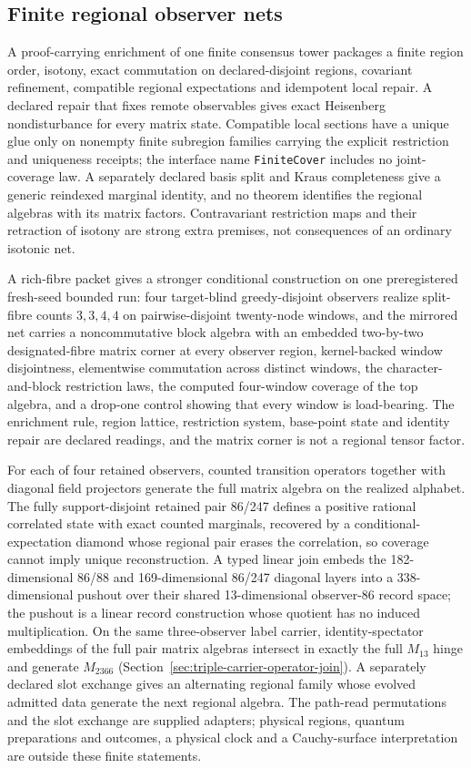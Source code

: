 \documentclass[11pt]{article}
\newcounter{none}
\begin{document}
\subsection{Finite regional observer nets}
\label{sec:regional-net}

A proof-carrying enrichment of one finite consensus tower packages a finite
region order, isotony, exact commutation on declared-disjoint regions,
covariant refinement, compatible regional expectations and idempotent local
repair. A declared repair that fixes remote observables gives exact Heisenberg
nondisturbance for every matrix state. Compatible local sections have a unique
glue only on nonempty finite subregion families carrying the explicit
restriction and uniqueness receipts; the interface name \texttt{FiniteCover}
includes no joint-coverage law. A separately declared basis split and Kraus
completeness give a generic reindexed marginal identity, and no theorem
identifies the regional algebras with its matrix factors. Contravariant
restriction maps and their retraction of isotony are strong extra premises,
not consequences of an ordinary isotonic net.

A rich-fibre packet gives a stronger conditional construction on one
preregistered fresh-seed bounded run: four target-blind greedy-disjoint
observers realize split-fibre counts \(3,3,4,4\) on pairwise-disjoint
twenty-node windows, and the mirrored net carries a noncommutative block
algebra with an embedded two-by-two designated-fibre matrix corner at every
observer region, kernel-backed window disjointness, elementwise commutation
across distinct windows, the character-and-block restriction laws, the
computed four-window coverage of the top algebra, and a drop-one control
showing that every window is load-bearing. The enrichment rule, region
lattice, restriction system, base-point state and identity repair are declared
readings, and the matrix corner is not a regional tensor factor.

For each of four retained observers, counted transition operators together
with diagonal field projectors generate the full matrix algebra on the
realized alphabet. The fully support-disjoint retained pair 86/247 defines a
positive rational correlated state with exact counted marginals, recovered by
a conditional-expectation diamond whose regional pair erases the correlation,
so coverage cannot imply unique reconstruction. A typed linear join embeds the
182-dimensional 86/88 and 169-dimensional 86/247 diagonal layers into a
338-dimensional pushout over their shared 13-dimensional observer-86 record
space; the pushout is a linear record construction whose quotient has no
induced multiplication. On the same three-observer label carrier,
identity-spectator embeddings of the full pair matrix algebras intersect in
exactly the full \(M_{13}\) hinge and generate \(M_{2366}\)
(Section~\ref{sec:triple-carrier-operator-join}). A separately declared slot
exchange gives an alternating regional family whose evolved admitted data
generate the next regional algebra. The path-read permutations and the slot
exchange are supplied adapters; physical regions, quantum preparations and
outcomes, a physical clock and a Cauchy-surface interpretation are outside
these finite statements.
\end{document}
